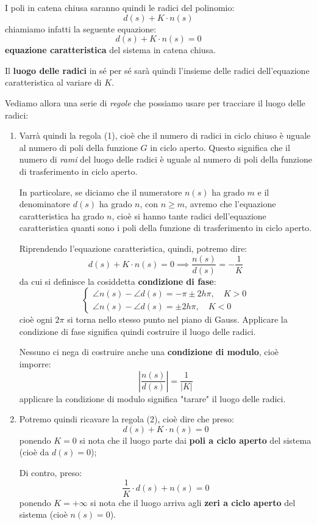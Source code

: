 \documentclass[a4paper,11pt]{article}
\begin{document}
I poli in catena chiusa saranno quindi le radici del polinomio:
$$
d(s) + K \cdot n(s)
$$
chiamiamo infatti la seguente equazione:
$$
d(s) + K \cdot n(s) = 0
$$
\textbf{equazione caratteristica} del sistema in catena chiusa.

Il \textbf{luogo delle radici} in sé per sé sarà quindi l'insieme delle radici dell'equazione caratteristica al variare di $K$.

Vediamo allora una serie di \textit{regole} che possiamo usare per tracciare il luogo delle radici:

\begin{enumerate}
	\item 
Varrà quindi la regola (1), cioè che il numero di radici in ciclo chiuso è uguale al numero di poli della funzione $G$ in ciclo aperto.
		Questo significa che il numero di \textit{rami} del luogo delle radici è uguale al numero di poli della funzione di trasferimento in ciclo aperto.

In particolare, se diciamo che il numeratore $n(s)$ ha grado $m$ e il denominatore $d(s)$ ha grado $n$, con $n \geq m$, avremo che l'equazione caratteristica ha grado $n$, cioè si hanno tante radici dell'equazione caratteristica quanti sono i poli della funzione di trasferimento in ciclo aperto.

Riprendendo l'equazione caratteristica, quindi, potremo dire:
$$
d(s) + K \cdot n(s) = 0 \implies \frac{n(s)}{d(s)} = -\frac{1}{K}
$$
da cui si definisce la cosiddetta \textbf{condizione di fase}:
\[
	\begin{cases}
		\angle n(s) - \angle d(s) = -\pi \pm 2 h \pi, \quad K > 0 \\
		\angle n(s) - \angle d(s) = \pm 2 h \pi, \quad K < 0
	\end{cases}
\]
cioè ogni $2 \pi$ si torna nello stesso punto nel piano di Gauss.
Applicare la condizione di fase significa quindi costruire il luogo delle radici.

Nessuno ci nega di costruire anche una \textbf{condizione di modulo}, cioè imporre:
$$
\left| \frac{n(s)}{d(s)} \right| = \frac{1}{|K|}
$$
applicare la condizione di modulo significa "tarare" il luogo delle radici.

	\item
Potremo quindi ricavare la regola (2), cioè dire che preso:
$$
d(s) + K \cdot n(s) = 0
$$
ponendo $K = 0$ si nota che il luogo parte dai \textbf{poli a ciclo aperto} del sistema (cioè da $d(s) = 0$);

Di contro, preso:
$$
\frac{1}{K} \cdot d(s) + n(s) = 0
$$
ponendo $K = +\infty$ si nota che il luogo arriva agli \textbf{zeri a ciclo aperto} del sistema (cioè $n(s) = 0$).


\end{enumerate}
\end{document}

